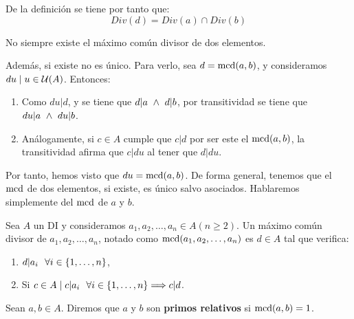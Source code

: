 De la definición se tiene por tanto que:
$$Div(d) = Div(a) \cap Div(b)$$

\begin{observacion}
    No siempre existe el máximo común divisor de dos elementos.
    
    Además, si existe no es único. Para verlo, sea $d=\operatorname{mcd}(a,b)$, y consideramos $du\mid u\in \mathcal{U}(A)$. Entonces:
    \begin{enumerate}
        \item Como $du|d$, y se tiene que $d|a\ \land \  d|b$, por transitividad se tiene que $du|a\ \land \  du|b$.
        \item Análogamente, si $c\in A$ cumple que $c|d$ por ser este el $\operatorname{mcd}(a,b)$, la transitividad afirma que $c|du$ al tener que $d|du$.
    \end{enumerate}

    Por tanto, hemos visto que $du=\operatorname{mcd}(a,b)$. De forma general, tenemos que el $\operatorname{mcd}$ de dos elementos, si existe, es único salvo asociados. Hablaremos simplemente del $\operatorname{mcd}$ de $a$ y $b$.
\end{observacion}

\begin{definicion}
    Sea $A$ un DI y consideramos $a_1, a_2, \ldots, a_n \in A (n \geq 2)$. Un máximo común divisor de $a_1, a_2, \ldots, a_n$, notado como $\operatorname{mcd}(a_1, a_2, \ldots, a_n)$ es $d \in A$ tal que verifica:
    \begin{enumerate}
        \item $d|a_i~~\forall i \in \{1, \ldots, n\} $,
        \item Si $c\in A \mid c|a_i~~\forall i \in \{1, \ldots, n\} \Longrightarrow c|d$.
    \end{enumerate}
\end{definicion}


\begin{definicion}
    Sean $a,b \in A$. Diremos que $a$ y $b$ son \textbf{primos relativos} si $\operatorname{mcd}(a,b)=1$.
\end{definicion}

